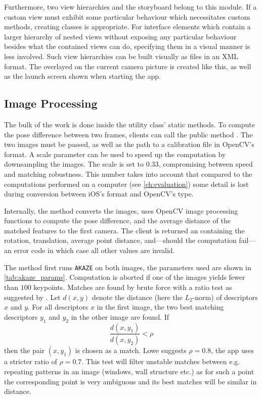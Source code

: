 Furthermore, two view hierarchies and the storyboard belong to this module.  If
a custom view must exhibit some particular behaviour which necessitates custom
methods, creating classes is appropriate. For interface elements which contain a
larger hierarchy of nested views without exposing any particular behaviour
besides what the contained views can do,
specifying them in a visual manner is less involved. Such view hierarchies can
be built visually as  files in an XML format. The
 overlayed on the current camera picture is created like
this, as well as the launch screen shown when starting the app.


\subsection{Image Processing}


The bulk of the work is done inside the utility class'  static
methods. To compute the pose difference between two frames, clients can call the
public method
.
The two images must be passed, as well as the path to a calibration file in
OpenCV's  format. A scale parameter can be used to speed up
the computation by downsampling the images.  The scale is set to $0.33$,
compromising between speed and matching robustness. This number takes into
account that compared to the computations performed on a computer (see
\autoref{ch:evaluation}) some detail is lost during conversion between iOS's
 format and OpenCV's  type.

Internally, the method converts the images, uses OpenCV image processing
functions to compute the pose difference, and the average distance of the matched
features to the first camera. The client is returned an 
containing the rotation, translation, average point distance, and---should the
computation fail---an error code in which case all other values are invalid.

The method first runs \texttt{AKAZE} on both images, the parameters used are
shown in \autoref{tab:akaze_params}.  Computation is aborted if one of the
images yields fewer than $100$ keypoints.  Matches are found by brute force with
a ratio test as suggested by \citet{lowe2004}. Let $d(x,y)$ denote the distance
(here the $L_2$-norm) of descriptors $x$ and $y$. For all descriptors $x$ in the
first image, the two best matching descriptors $y_1$ and $y_2$ in the other
image are found. If
\begin{equation*}
   \frac{d(x,y_1)}{d(x,y_2)} < \rho
\end{equation*}
then the pair $(x,y_1)$ is chosen as a match. Lowe suggests $\rho=0.8$, the app
uses a stricter ratio of $\rho=0.7$. This test will filter unstable matches
between e.g. repeating patterns in an image (windows, wall structure etc.) as
for such a point the corresponding point is very ambiguous and its best matches
will be similar in distance.

